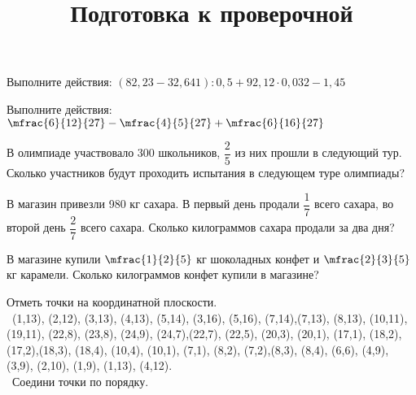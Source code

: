 \begin{class}[number=7]
	\title{Подготовка к проверочной}
	\begin{listofex}
		\item Выполните действия: \( (82,23-32,641):0,5+92,12\cdot0,032-1,45 \)
		\item Выполните действия: \( \mfrac{6}{12}{27}-\mfrac{4}{5}{27}+\mfrac{6}{16}{27} \)
		\item В олимпиаде участвовало 300 школьников, \( \dfrac{2}{5} \)  из них прошли в следующий тур. Сколько участников будут проходить испытания в следующем туре олимпиады?
		\item В магазин привезли 980 кг сахара. В первый день продали \( \dfrac{1}{7} \) всего сахара, во второй день  \( \dfrac{2}{7} \) всего сахара. Сколько килограммов сахара продали за два дня?
		\item В магазине купили  \( \mfrac{1}{2}{5} \) кг шоколадных конфет и \( \mfrac{2}{3}{5}\) кг карамели. Сколько килограммов конфет купили в магазине?
		\item Отметь точки на координатной плоскости. \\\
		(1,13), (2,12), (3,13), (4,13), (5,14), (3,16), (5,16), (7,14),(7,13), (8,13), (10,11), (19,11), (22,8), (23,8), (24,9), (24,7),(22,7), (22,5), (20,3), (20,1), (17,1), (18,2), (17,2),(18,3), (18,4), (10,4), (10,1), (7,1), (8,2), (7,2),(8,3), (8,4), (6,6), (4,9), (3,9), (2,10), (1,9), (1,13), (4,12).\\\
		Соедини точки по порядку.
	\end{listofex}
\end{class}

